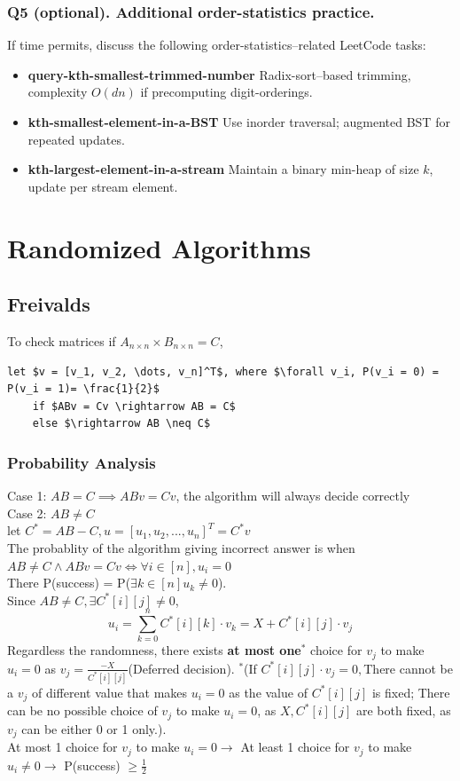 \documentclass[9pt]{extarticle}
\begin{document}
\subsubsection*{Q5 (optional). Additional order-statistics practice.}

If time permits, discuss the following order-statistics–related LeetCode tasks:
\begin{itemize}
    \item \textbf{query-kth-smallest-trimmed-number}  
          Radix-sort–based trimming, complexity $O(dn)$ if precomputing digit-orderings.
    \item \textbf{kth-smallest-element-in-a-BST}  
          Use inorder traversal; augmented BST for repeated updates.
    \item \textbf{kth-largest-element-in-a-stream}  
          Maintain a binary min-heap of size $k$, update per stream element.
\end{itemize}






\newpage
\section{Randomized Algorithms}
\subsection{Freivalds}
To check matrices if $A_{n\times n} \times B_{n\times n} = C$, 
\begin{lstlisting}[mathescape=true]
    let $v = [v_1, v_2, \dots, v_n]^T$, where $\forall v_i, P(v_i = 0) = P(v_i = 1)= \frac{1}{2}$
    if $ABv = Cv \rightarrow AB = C$
    else $\rightarrow AB \neq C$
\end{lstlisting}
\subsubsection{Probability Analysis}
Case 1: $AB = C \implies ABv = Cv$, the algorithm will always decide correctly\\
Case 2: $AB \neq C$\\
let $C^* = AB - C, u = [u_1, u_2, ..., u_n]^T = C^*v$\\
The probablity of the algorithm giving incorrect answer is when $AB \neq C \land ABv = Cv \iff \forall i \in [n], u_i = 0$\\
There P(success) = P($\exists k \in [n] u_k\neq 0$). \\
Since $AB \neq C, \exists C^*[i][j] \neq 0$, 
\[u_i = \sum_{k=0}^{n} C^*[i][k]\cdot v_k = X + C^*[i][j]\cdot v_j\]
Regardless the randomness, there exists \textbf{at most one}$^*$ choice for $v_j$ to make $u_i=0$ as $v_j = \frac{-X}{C^*[i][j]}$(Deferred decision).  
$^*$(If $C^*[i][j]\cdot v_j = 0, $There cannot be a $v_j$ of different value that makes $u_i=0$ as the value of $C^*[i][j]$ is fixed; There can be no possible choice 
of $v_j$ to make $u_i = 0$, as $X, C^*[i][j]$ are both fixed, as $v_j$ can be either 0 or 1 only.). \\
At most 1 choice for $v_j$ to make $u_i = 0 \rightarrow$ At least 1 choice for $v_j$ to make $u_i \neq 0 \rightarrow$ P(success) $\geq \frac{1}{2}$
\end{document}
